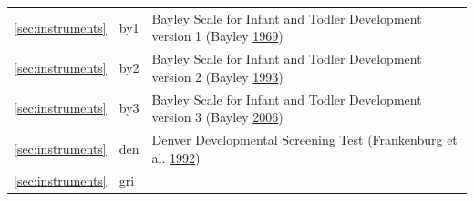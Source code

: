 \documentclass[
]{book}
\begin{document}
\begin{longtable}[]{@{}lll@{}}
\begin{minipage}[t]{0.12\columnwidth}
\ref{sec:instruments}\strut
\end{minipage} & \begin{minipage}[t]{0.19\columnwidth}\raggedright
by1\strut
\end{minipage} & \begin{minipage}[t]{0.61\columnwidth}\raggedright
Bayley Scale for Infant and Todler Development version 1 (Bayley \protect\hyperlink{ref-bayley1969}{1969})\strut
\end{minipage}\tabularnewline
\begin{minipage}[t]{0.12\columnwidth}\raggedright
\ref{sec:instruments}\strut
\end{minipage} & \begin{minipage}[t]{0.19\columnwidth}\raggedright
by2\strut
\end{minipage} & \begin{minipage}[t]{0.61\columnwidth}\raggedright
Bayley Scale for Infant and Todler Development version 2 (Bayley \protect\hyperlink{ref-bayley1993}{1993})\strut
\end{minipage}\tabularnewline
\begin{minipage}[t]{0.12\columnwidth}\raggedright
\ref{sec:instruments}\strut
\end{minipage} & \begin{minipage}[t]{0.19\columnwidth}\raggedright
by3\strut
\end{minipage} & \begin{minipage}[t]{0.61\columnwidth}\raggedright
Bayley Scale for Infant and Todler Development version 3 (Bayley \protect\hyperlink{ref-bayley2006}{2006})\strut
\end{minipage}\tabularnewline
\begin{minipage}[t]{0.12\columnwidth}\raggedright
\ref{sec:instruments}\strut
\end{minipage} & \begin{minipage}[t]{0.19\columnwidth}\raggedright
den\strut
\end{minipage} & \begin{minipage}[t]{0.61\columnwidth}\raggedright
Denver Developmental Screening Test (Frankenburg et al. \protect\hyperlink{ref-frankenburg1992}{1992})\strut
\end{minipage}\tabularnewline
\begin{minipage}[t]{0.12\columnwidth}\raggedright
\ref{sec:instruments}\strut
\end{minipage} & \begin{minipage}[t]{0.19\columnwidth}\raggedright
gri\strut

\end{minipage}
\end{longtable}
\end{document}
